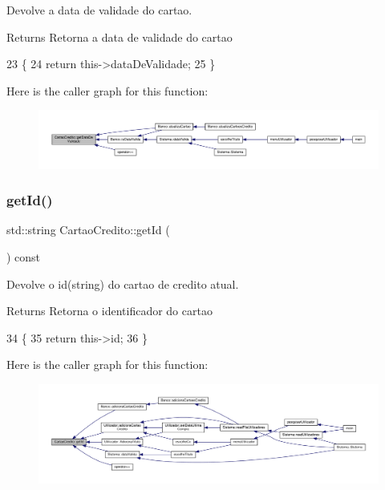 Devolve a data de validade do cartao. 

\begin{DoxyReturn}{Returns}
Retorna a data de validade do cartao 
\end{DoxyReturn}

\begin{DoxyCode}
23 \{
24     \textcolor{keywordflow}{return} this->dataDeValidade;
25 \}
\end{DoxyCode}
Here is the caller graph for this function\+:
\nopagebreak
\begin{figure}[H]
\begin{center}
\leavevmode
\includegraphics[width=350pt]{classCartaoCredito_ab28b73bbecc20b5c23348e1172230533_icgraph}
\end{center}
\end{figure}
\mbox{\label{classCartaoCredito_ab59d60e4d155e7f29aef888ea3139ee5}} 
\subsubsection{\texorpdfstring{get\+Id()}{getId()}}
{\footnotesize\ttfamily std\+::string Cartao\+Credito\+::get\+Id (\begin{DoxyParamCaption}{ }\end{DoxyParamCaption}) const}



Devolve o id(string) do cartao de credito atual. 

\begin{DoxyReturn}{Returns}
Retorna o identificador do cartao 
\end{DoxyReturn}

\begin{DoxyCode}
34 \{
35     \textcolor{keywordflow}{return} this->id;
36 \}
\end{DoxyCode}
Here is the caller graph for this function\+:
\nopagebreak
\begin{figure}[H]
\begin{center}
\leavevmode
\includegraphics[width=350pt]{classCartaoCredito_ab59d60e4d155e7f29aef888ea3139ee5_icgraph}
\end{center}
\end{figure}
\mbox{\label{classCartaoCredito_a5d10788d907961f86779efaecb6a231d}} 
